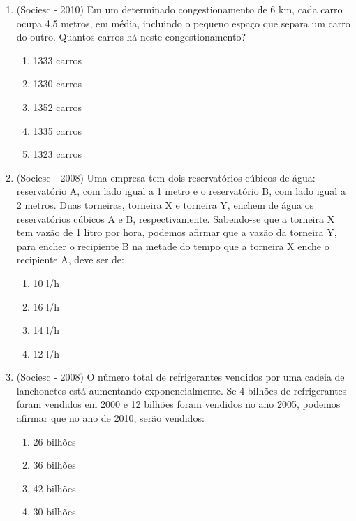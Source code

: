 \begin{enumerate}
 \item (Sociesc - 2010) Em um determinado congestionamento de 6 km, cada carro ocupa 4,5 metros, em média, incluindo o pequeno espaço que separa um carro do outro. Quantos carros há neste congestionamento?
  \begin{enumerate}
  \item 1333 carros
  \item 1330 carros
  \item 1352 carros
  \item 1335 carros
  \item 1323 carros
 \end{enumerate}
 
 \item (Sociesc - 2008) Uma empresa tem dois reservatórios cúbicos de água: reservatório A, com lado igual a 1 metro e o reservatório B, com lado igual a 2 metros. Duas torneiras, torneira X e torneira Y, enchem de água os reservatórios cúbicos A e B, respectivamente. Sabendo-se que a torneira X tem vazão de 1 litro por hora, podemos afirmar que a vazão da torneira Y, para encher o recipiente B na metade do tempo que a torneira X enche o recipiente A, deve ser de:
  \begin{enumerate}
  \item 10 l/h
  \item 16 l/h
  \item 14 l/h
  \item 12 l/h
 \end{enumerate}
 
 \item (Sociesc - 2008) O número total de refrigerantes vendidos por uma cadeia de lanchonetes está aumentando exponencialmente. Se 4 bilhões de refrigerantes foram vendidos em 2000 e 12 bilhões foram vendidos no ano 2005, podemos afirmar que no ano de 2010, serão vendidos:
  \begin{enumerate}
  \item 26 bilhões
  \item 36 bilhões
  \item 42 bilhões
  \item 30 bilhões
 \end{enumerate}
 

\end{enumerate}
